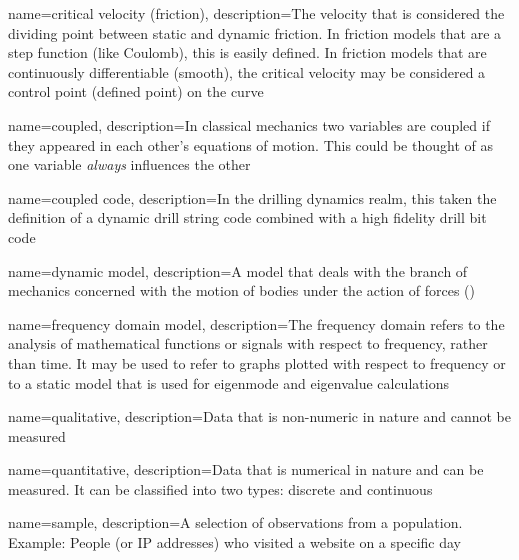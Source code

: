 
\newcommand*{\comma}{,}


{
	name=critical velocity (friction),
	description=The velocity that is considered the dividing point between static and dynamic friction.  In friction models that are a step function (like Coulomb)\comma{} this is easily defined.  In friction models that are continuously differentiable (smooth)\comma{} the critical velocity may be considered a control point (defined point) on the curve
}

{
	name=coupled,
	description=In classical mechanics two variables are coupled if they appeared in each other's equations of motion.  This could be thought of as one variable \textit{always} influences the other
}

{
	name=coupled code,
	description=In the drilling dynamics realm\comma{} this taken the definition of a dynamic drill string code combined with a high fidelity drill bit code
}

{
	name=dynamic model,
	description=A model that deals with the branch of mechanics concerned with the motion of bodies under the action of forces (\dynamicforcebalance)
}

{
	name=frequency domain model,
	description=The frequency domain refers to the analysis of mathematical functions or signals with respect to frequency\comma{} rather than time.  It may be used to refer to graphs plotted with respect to frequency or to a static model that is used for eigenmode and eigenvalue calculations
}

{
	name=qualitative,
	description={Data that is non-numeric in nature and cannot be measured}
}

{
	name=quantitative,
	description={Data that is numerical in nature and can be measured.  It can be classified into two types: discrete and continuous}
}

{
	name=sample,
	description={A selection of observations from a population.  Example: People (or IP addresses) who visited a website on a specific day}
}

